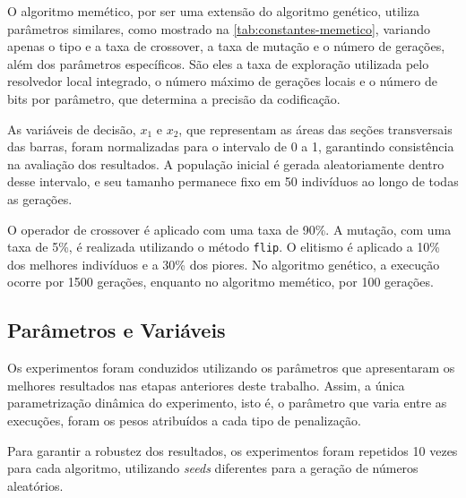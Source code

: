O algoritmo memético, por ser uma extensão do algoritmo genético, utiliza parâmetros similares, como mostrado na \autoref{tab:constantes-memetico}, variando apenas o tipo e a taxa de \gls{crossover}, a taxa de mutação e o número de gerações, além dos parâmetros específicos.
São eles a taxa de exploração utilizada pelo resolvedor local integrado, o número máximo de gerações locais e o número de bits por parâmetro, que determina a precisão da codificação.

As variáveis de decisão, \(x_1\) e \(x_2\), que representam as áreas das seções transversais das barras, foram normalizadas para o intervalo de 0 a 1, garantindo consistência na avaliação dos resultados. A população inicial é gerada aleatoriamente dentro desse intervalo, e seu tamanho permanece fixo em 50 indivíduos ao longo de todas as gerações.

O operador de \gls{crossover} é aplicado com uma taxa de 90\%. A mutação, com uma taxa de 5\%, é realizada utilizando o método \texttt{flip}. O elitismo é aplicado a 10\% dos melhores indivíduos e a 30\% dos piores. No algoritmo genético, a execução ocorre por 1500 gerações, enquanto no algoritmo memético, por 100 gerações.

\subsection{Parâmetros e Variáveis}

Os experimentos foram conduzidos utilizando os parâmetros que apresentaram os melhores resultados nas etapas anteriores deste trabalho. Assim, a única parametrização dinâmica do experimento, isto é, o parâmetro que varia entre as execuções, foram os pesos atribuídos a cada tipo de penalização.

Para garantir a robustez dos resultados, os experimentos foram repetidos 10 vezes para cada algoritmo, utilizando \textit{seeds} diferentes para a geração de números aleatórios.